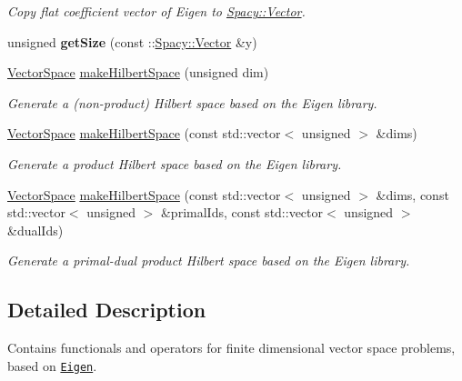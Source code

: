 \begin{DoxyCompactItemize}
\begin{DoxyCompactList}\small\item\em Copy flat coefficient vector of Eigen to \hyperlink{classSpacy_1_1Vector}{Spacy\-::\-Vector}. \end{DoxyCompactList}\item 
\hypertarget{namespaceSpacy_1_1Rn_a3f36c8bb8bdede3ff8573631ee7f3e79}{unsigned {\bfseries get\-Size} (const \-::\hyperlink{classSpacy_1_1Vector}{Spacy\-::\-Vector} \&y)}\label{namespaceSpacy_1_1Rn_a3f36c8bb8bdede3ff8573631ee7f3e79}

\item 
\hyperlink{classSpacy_1_1VectorSpace}{Vector\-Space} \hyperlink{namespaceSpacy_1_1Rn_abadd5b9e11793fdb2f689a3ee908e5e7}{make\-Hilbert\-Space} (unsigned dim)
\begin{DoxyCompactList}\small\item\em Generate a (non-\/product) Hilbert space based on the Eigen library. \end{DoxyCompactList}\item 
\hypertarget{namespaceSpacy_1_1Rn_a4e9d4ebff60dde8a465a464531af13e1}{\hyperlink{classSpacy_1_1VectorSpace}{Vector\-Space} \hyperlink{namespaceSpacy_1_1Rn_a4e9d4ebff60dde8a465a464531af13e1}{make\-Hilbert\-Space} (const std\-::vector$<$ unsigned $>$ \&dims)}\label{namespaceSpacy_1_1Rn_a4e9d4ebff60dde8a465a464531af13e1}

\begin{DoxyCompactList}\small\item\em Generate a product Hilbert space based on the Eigen library. \end{DoxyCompactList}\item 
\hypertarget{namespaceSpacy_1_1Rn_a5df449d080e704158ff479c36634ee74}{\hyperlink{classSpacy_1_1VectorSpace}{Vector\-Space} \hyperlink{namespaceSpacy_1_1Rn_a5df449d080e704158ff479c36634ee74}{make\-Hilbert\-Space} (const std\-::vector$<$ unsigned $>$ \&dims, const std\-::vector$<$ unsigned $>$ \&primal\-Ids, const std\-::vector$<$ unsigned $>$ \&dual\-Ids)}\label{namespaceSpacy_1_1Rn_a5df449d080e704158ff479c36634ee74}

\begin{DoxyCompactList}\small\item\em Generate a primal-\/dual product Hilbert space based on the Eigen library. \end{DoxyCompactList}\end{DoxyCompactItemize}


\subsection{Detailed Description}
Contains functionals and operators for finite dimensional vector space problems, based on \href{http://eigen.tuxfamily.org}{\tt Eigen}. 

